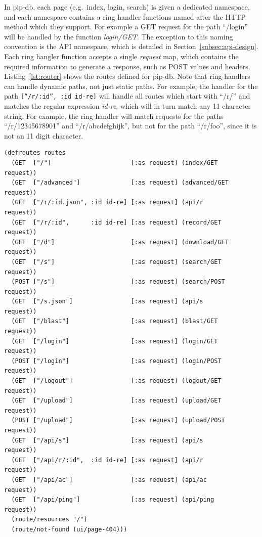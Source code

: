 In pip-db, each page (e.g.\ index, login, search) is given a dedicated
namespace, and each namespace contains a ring handler functions named
after the HTTP method which they support. For example a GET request
for the path ``/login'' will be handled by the function
\textit{login/GET}. The exception to this naming convention is the API
namespace, which is detailed in Section~\ref{subsec:api-design}. Each
ring hangler function accepts a single \textit{request} map, which
contains the required information to generate a response, such as POST
values and headers. Listing~\ref{lst:router} shows the routes defined
for pip-db. Note that ring handlers can handle dynamic paths, not just
static paths. For example, the handler for the path
\texttt{[``/r/:id'', :id id-re]} will handle all routes which start
with ``/r/'' and matches the regular expression \textit{id-re}, which
will in turn match any 11 character string. For example, the ring
handler will match requests for the paths ``/r/12345678901'' and
``/r/abcdefghijk'', but not for the path ``/r/foo'', since it is not
an 11 digit character.

\br{}


\lstset{language=Clojure}
\begin{lstlisting}[label=lst:router,caption={%
      [Application ring handler routes]
      Application ring handler routes, taken from \texttt{middleware.clj}.}]
(defroutes routes
  (GET  ["/"]                      [:as request] (index/GET       request))
  (GET  ["/advanced"]              [:as request] (advanced/GET    request))
  (GET  ["/r/:id.json", :id id-re] [:as request] (api/r           request))
  (GET  ["/r/:id",      :id id-re] [:as request] (record/GET      request))
  (GET  ["/d"]                     [:as request] (download/GET    request))
  (GET  ["/s"]                     [:as request] (search/GET      request))
  (POST ["/s"]                     [:as request] (search/POST     request))
  (GET  ["/s.json"]                [:as request] (api/s           request))
  (GET  ["/blast"]                 [:as request] (blast/GET       request))
  (GET  ["/login"]                 [:as request] (login/GET       request))
  (POST ["/login"]                 [:as request] (login/POST      request))
  (GET  ["/logout"]                [:as request] (logout/GET      request))
  (GET  ["/upload"]                [:as request] (upload/GET      request))
  (POST ["/upload"]                [:as request] (upload/POST     request))
  (GET  ["/api/s"]                 [:as request] (api/s           request))
  (GET  ["/api/r/:id",  :id id-re] [:as request] (api/r           request))
  (GET  ["/api/ac"]                [:as request] (api/ac          request))
  (GET  ["/api/ping"]              [:as request] (api/ping        request))
  (route/resources "/")
  (route/not-found (ui/page-404)))
\end{lstlisting}

